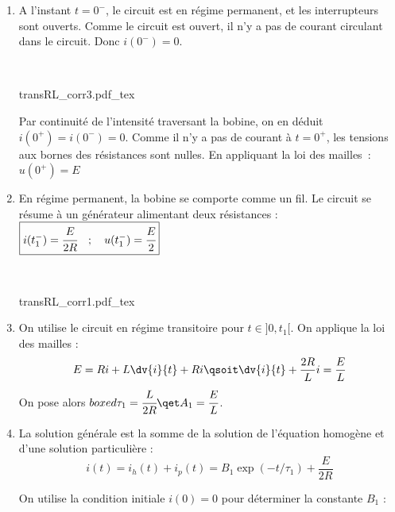 \documentclass[a4paper, 10pt, garamond, oneside]{book}
\begin{document}
{}{
	\begin{enumerate}
		\item \noindent
		      \begin{minipage}[t]{.49\linewidth}
			      A l'instant $t=0^-$, le circuit est en régime permanent, et les interrupteurs sont ouverts. Comme le circuit est ouvert, il n'y a pas de courant circulant dans le circuit. Donc $\boxed{i(0^-)=0}$.
		      \end{minipage}
		      \hfill
		      \begin{minipage}[t]{.49\linewidth}
			      ~
			      \begin{center}
				      {transRL_corr3.pdf_tex}
			      \end{center}
		      \end{minipage}
		      Par continuité de l'intensité traversant la bobine, on en déduit
		      $\boxed{i(0^+)=i(0^-)=0}$.
		      Comme il n'y a pas de courant à $t=0^+$, les tensions aux bornes des
		      résistances sont nulles. En appliquant la loi des mailles~:
		      $\boxed{u(0^+)=E}$
		\item
		      \noindent
		      \begin{minipage}[t]{.49\linewidth}
			      En régime permanent, la bobine se comporte comme un fil. Le circuit se résume à un générateur alimentant deux résistances : $\boxed{i(t_1^-)=\cfrac{E}{2R}\quad ;\quad u(t_1^-)=\cfrac{E}{2}}$
		      \end{minipage}
		      \hfill
		      \begin{minipage}[t]{.49\linewidth}
			      ~
			      \begin{center}
				      {transRL_corr1.pdf_tex}
			      \end{center}
		      \end{minipage}
		\item
		      On utilise le circuit en régime transitoire pour $t\in]0,t_1[$. On applique la loi des mailles :
		      \[
			      E=Ri+L\dv{i}{t}+Ri
			      \qsoit
			      \dv{i}{t}+\frac{2R}{L}i=\frac{E}{L}
		      \]
		      On pose alors $boxed{\tau_1=\cfrac{L}{2R}\qet A_1=\cfrac{E}{L}}$.
		\item
		      La solution générale est la somme de la solution de l'équation homogène et d'une solution particulière :
		      \[
			      i(t)=i_h(t)+i_p(t)=B_1\exp(-t/\tau_1)+\frac{E}{2R}
		      \]

		      On utilise la condition initiale $i(0)=0$ pour déterminer la constante $B_1$ :


\end{enumerate}}
\end{document}
